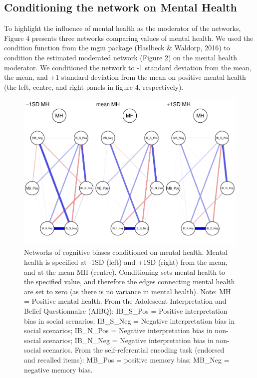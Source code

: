 \documentclass[man,floatsintext]{apa6}
\begin{document}
\hypertarget{conditioning-the-network-on-mental-health}{%
\subsection{Conditioning the network on Mental Health}\label{conditioning-the-network-on-mental-health}}

To highlight the influence of mental health as the moderator of the networks, Figure 4 presents three networks comparing values of mental health. We used the condition function from the mgm package (Haslbeck \& Waldorp, 2016) to condition the estimated moderated network (Figure 2) on the mental health moderator. We conditioned the network to -1 standard deviation from the mean, the mean, and +1 standard deviation from the mean on positive mental health (the left, centre, and right panels in figure 4, respectively).

\begin{figure}
\centering
\includegraphics{script_files/figure-latex/unnamed-chunk-5-1.pdf}
\caption{\label{fig:unnamed-chunk-5}Networks of cognitive biases conditioned on mental health. Mental health is specified at -1SD (left) and +1SD (right) from the mean, and at the mean MH (centre). Conditioning sets mental health to the specified value, and therefore the edges connecting mental health are set to zero (as there is no variance in mental health).
Note: MH = Positive mental health. From the Adolescent Interpretation and Belief Questionnaire (AIBQ): IB\_S\_Pos = Positive interpretation bias in social scenarios; IB\_S\_Neg = Negative interpretation bias in social scenarios; IB\_N\_Pos = Negative interpretation bias in non-social scenarios; IB\_N\_Neg = Negative interpretation bias in non-social scenarios. From the self-referential encoding task (endorsed and recalled items): MB\_Pos = positive memory bias; MB\_Neg = negative memory bias.}
\end{figure}
\end{document}
